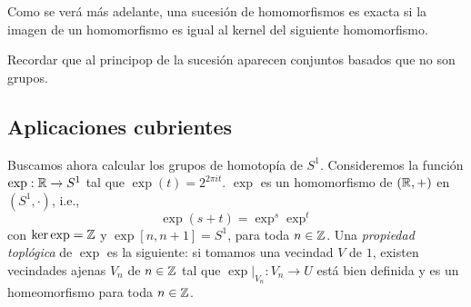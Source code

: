 \begin{nota}
    Como se verá más adelante, una sucesión de homomorfismos es exacta si la imagen de un homomorfismo es igual al kernel del siguiente homomorfismo.
\end{nota}
\begin{nota}
    Recordar que al principop de la sucesión aparecen conjuntos basados que no son grupos.
\end{nota}

\subsection{Aplicaciones cubrientes}

Buscamos ahora calcular los grupos de homotopía de $S^1$. Consideremos la función $\exp:\mathbb{R}\to S^1$ tal que $\exp(t)=2^{2\pi it}$. $\exp$ es un homomorfismo de $(\mathbb{R},+)$ en $(S^1,\cdot)$, i.e., 
\begin{equation*}
    \exp(s+t)=\exp^{s}\exp^{t}
\end{equation*}
con $\ker\exp=\mathbb{Z}$ y $\exp[n,n+1]=S^1$, para toda $n\in \mathbb{Z}$. Una \textit{propiedad toplógica} de $\exp$ es la siguiente: si tomamos una vecindad $V$ de $1$, existen vecindades ajenas $V_n$ de $n\in \mathbb{Z}$ tal que $\exp|_{V_n}:V_n\to U$ está bien definida y es un homeomorfismo para toda $n\in \mathbb{Z}$.
